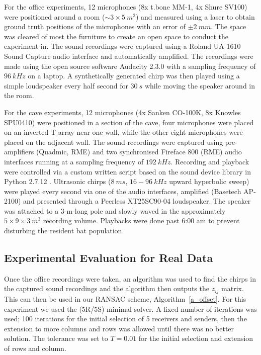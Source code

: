\documentclass{article}
\begin{document}
For the office experiments, 12 microphones (8x t.bone MM-1, 4x Shure SV100) were positioned around a room ($\sim 3 \times 5~m^2$) and measured using a laser to obtain ground truth positions of the microphones with an error of $\pm 2~ mm$. The space was cleared of most the furniture to create an open space to conduct the experiment in. The sound recordings were captured using a Roland UA-1610 Sound Capture audio interface and automatically amplified. The recordings were made using the open source software Audacity 2.3.0 with a sampling frequency of $96~kHz$ on a laptop. A synthetically generated chirp was then played using a simple loudspeaker every half second for $30~s$ while moving the speaker around in the room. 

For the cave experiments, 12 microphones (4x Sanken CO-100K, 8x Knowles SPU0410) were positioned in a section of the cave, four microphones were placed on an inverted T array near one wall, while the other eight microphones were placed on the adjacent wall. The sound recordings were captured using pre-amplifiers (Quadmic, RME) and two synchronised Fireface 800 (RME) audio interfaces running at a sampling frequency of $192 ~kHz$. Recording and playback were controlled via a custom written script based on the sound device library
\cite{geier2015}
in Python 2.7.12 
\cite{van1995python}.
Ultrasonic chirps ($8~ms$, $16-96~kHz$ upward hyperbolic sweep) were played every second via one of the audio interfaces, amplified (Basetech AP-2100) and presented through a Peerless XT25SC90-04 loudspeaker. The speaker was attached to a 3-m-long pole and slowly waved in the approximately $5 \times 9 \times 3 ~m^3$ recording volume. Playbacks were done past 6:00 am to prevent disturbing the resident bat population.
\vspace{-5pt}
\subsection{Experimental Evaluation for Real Data}
\vspace{-5pt}
Once the office recordings were taken, an algorithm was used to find the chirps in the captured sound recordings and the algorithm then outputs the $z_{ij}$ matrix.  This can then be used in our RANSAC scheme, Algorithm~\ref{a_offset}. For this experiment we used the (5R/5S)  minimal solver. A fixed number of iterations was used; 100 iterations for the initial selection of 5 receivers and senders, then the extension to more columns and rows was allowed until there was no better solution. The tolerance was set to $T=0.01$ for the initial selection and extension of rows and column.
\end{document}
